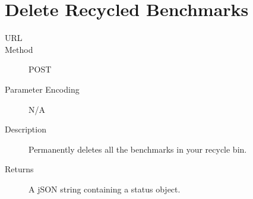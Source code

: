 \section{Delete Recycled Benchmarks}
\begin{description}
\item [URL] 
\item [Method] POST
\item [Parameter Encoding] N/A
\item [Description] Permanently deletes all the benchmarks in your recycle bin.
\item [Returns] A jSON string containing a status object.
\end{description}
